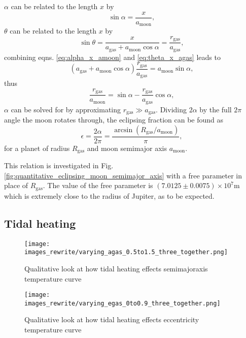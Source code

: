 \documentclass[12pt, onecolumn]{revtex4-2}    %
\begin{document}
$\alpha$ can be related to the length $x$ by
\begin{equation}
  \sin \alpha = \frac{x}{a_\text{moon}}, \label{eq:alpha_x_amoon}
\end{equation}
$\theta$ can be related to the length $x$ by
\begin{equation}
  \sin \theta = \frac{x}{a_\text{gas} + a_\text{moon} \cos\alpha} = \frac{r_\text{gas}}{a_\text{gas}} , \label{eq:theta_x_agas}
\end{equation}
combining eqns. \eqref{eq:alpha_x_amoon} and \eqref{eq:theta_x_agas} leads to
\begin{equation}
  (a_\text{gas} + a_\text{moon}\cos\alpha) \frac{r_\text{gas}}{a_\text{gas}} = a_\text{moon} \sin\alpha,
\end{equation}
thus
\begin{equation}
  \frac{r_\text{gas}}{a_\text{moon}} = \sin\alpha - \frac{r_\text{gas}}{a_\text{gas}}\cos\alpha,
\end{equation}
$\alpha$ can be solved for by approximating $r_\text{gas} \gg a_\text{gas}$.
Dividing $2\alpha$ by the full $2\pi$ angle the moon rotates through, the eclipsing fraction can be found as
\begin{equation}
  \epsilon = \frac{2\alpha}{2\pi} = \frac{\arcsin(R_\text{gas} / a_\text{moon})}{\pi},
  \label{eq:eclipsing_fraction}
\end{equation}
for a planet of radius $R_\text{gas}$ and moon semimajor axis $a_\text{moon}$.

This relation is investigated in Fig. \ref{fig:quantitative_eclipsing_moon_semimajor_axis} with a free parameter in place of $R_\text{gas}$.
The value of the free parameter is $(7.0125\pm 0.0075) \times 10^7 \text{m}$ which is extremely close to the radius of Jupiter, as to be expected.

\subsection{Tidal heating} \label{ssec:InvTidalHeating}
\begin{figure}
  \texttt{[image: images\_rewrite/varying\_agas\_0.5to1.5\_three\_together.png]}
  \caption{
    Qualitative look at how tidal heating effects semimajoraxis temperature curve
  }
  \label{fig:qualitative_tidalheating_semimajoraxis}
\end{figure}

\begin{figure}
  \texttt{[image: images\_rewrite/varying\_egas\_0to0.9\_three\_together.png]}
  \caption{
    Qualitative look at how tidal heating effects eccentricity temperature curve
  }
  \label{fig:qualitative_tidalheating_eccentrcity}
\end{figure}
\end{document}
